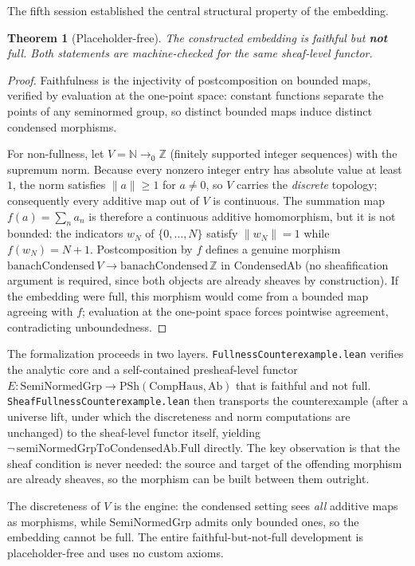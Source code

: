 \documentclass[11pt]{amsart}
\theoremstyle{plain}
\newtheorem{theorem}{Theorem}[section]
\theoremstyle{definition}
\newcommand{\CondAb}{\mathrm{CondensedAb}}
\newcommand{\SemiNormedGrp}{\mathrm{SemiNormedGrp}}
\begin{document}
The fifth session established the central structural property of the embedding.

\begin{theorem}[Placeholder-free]
\label{thm:fullness}
The constructed embedding is faithful but \textbf{not} full. Both statements are machine-checked for the same sheaf-level functor.
\end{theorem}

\begin{proof}
Faithfulness is the injectivity of postcomposition on bounded maps, verified by evaluation at the one-point space: constant functions separate the points of any seminormed group, so distinct bounded maps induce distinct condensed morphisms.

For non-fullness, let $V = \mathbb{N} \to_0 \mathbb{Z}$ (finitely supported integer sequences) with the supremum norm. Because every nonzero integer entry has absolute value at least $1$, the norm satisfies $\|a\| \ge 1$ for $a \neq 0$, so $V$ carries the \emph{discrete} topology; consequently every additive map out of $V$ is continuous. The summation map $f(a) = \sum_n a_n$ is therefore a continuous additive homomorphism, but it is not bounded: the indicators $w_N$ of $\{0, \dots, N\}$ satisfy $\|w_N\| = 1$ while $f(w_N) = N+1$. Postcomposition by $f$ defines a genuine morphism $\mathrm{banachCondensed}\,V \to \mathrm{banachCondensed}\,\mathbb{Z}$ in $\CondAb$ (no sheafification argument is required, since both objects are already sheaves by construction). If the embedding were full, this morphism would come from a bounded map agreeing with $f$; evaluation at the one-point space forces pointwise agreement, contradicting unboundedness.
\end{proof}

The formalization proceeds in two layers. \texttt{FullnessCounterexample.lean} verifies the analytic core and a self-contained presheaf-level functor $E : \SemiNormedGrp \to \mathrm{PSh}(\mathrm{CompHaus}, \mathrm{Ab})$ that is faithful and not full. \texttt{SheafFullnessCounterexample.lean} then transports the counterexample (after a universe lift, under which the discreteness and norm computations are unchanged) to the sheaf-level functor itself, yielding $\neg\,\mathrm{semiNormedGrpToCondensedAb}.\mathrm{Full}$ directly. The key observation is that the sheaf condition is never needed: the source and target of the offending morphism are already sheaves, so the morphism can be built between them outright.

The discreteness of $V$ is the engine: the condensed setting sees \emph{all} additive maps as morphisms, while $\SemiNormedGrp$ admits only bounded ones, so the embedding cannot be full. The entire faithful-but-not-full development is placeholder-free and uses no custom axioms.
\end{document}
